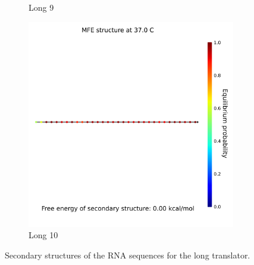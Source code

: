 \begin{figure}
\begin{subfigure}{.32\columnwidth}
  \caption{Long 9}
\end{subfigure}
\begin{subfigure}{.32\columnwidth}
  \centering
  \includegraphics[width=\linewidth]{images/long_rna_secondarystructure_10.png}
  \caption{Long 10}
\end{subfigure}
\caption{Secondary structures of the RNA sequences for the long translator.}
\label{long_secondary_structures}
\end{figure}
